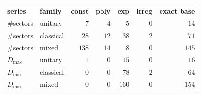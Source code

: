 \begin{tabular}{llrrrrr}
\hline
series & family & const & poly & exp & irreg & exact base \\
\hline
$\#$sectors & unitary & $7$ & $4$ & $5$ & $0$ & $14$ \\
$\#$sectors & classical & $28$ & $12$ & $38$ & $2$ & $71$ \\
$\#$sectors & mixed & $138$ & $14$ & $8$ & $0$ & $145$ \\
$D_{\max}$ & unitary & $1$ & $0$ & $15$ & $0$ & $16$ \\
$D_{\max}$ & classical & $0$ & $0$ & $78$ & $2$ & $64$ \\
$D_{\max}$ & mixed & $0$ & $0$ & $160$ & $0$ & $154$ \\
\hline
\end{tabular}
